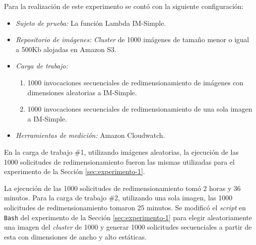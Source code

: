 Para la realización de este experimento se contó con la siguiente configuración:
\begin{itemize}
    \item \emph{Sujeto de prueba:} La función Lambda IM-Simple.
    \item \emph{Repositorio de imágenes:} \emph{Cluster} de 1000 imágenes de tamaño menor o igual a 500Kb alojadas en Amazon S3.
    \item \emph{Carga de trabajo:} 
    \begin{enumerate}
        \item 1000 invocaciones secuenciales de redimensionamiento de imágenes con dimensiones aleatorias a IM-Simple.
        \item 1000 invocaciones secuenciales de redimensionamiento de una sola imagen a IM-Simple.
    \end{enumerate}
    \item \emph{Herramientas de medición:} Amazon Cloudwatch.
\end{itemize}

En la carga de trabajo \#1, utilizando imágenes aleatorias, la ejecución de las 1000 solicitudes de redimensionamiento fueron las mismas utilizadas para el experimento de la Sección \ref{sec:experimento-1}. 

La ejecución de las 1000 solicitudes de redimensionamiento tomó 2 horas y 36 minutos. Para la carga de trabajo \#2, utilizando una sola imagen, las 1000 solicitudes de redimensionamiento tomaron 25 minutos. Se modificó el \emph{script} en \texttt{Bash} del experimento de la Sección \ref{sec:experimento-1} para elegir aleatoriamente una imagen del \emph{cluster} de 1000 y generar 1000 solicitudes secuenciales a partir de esta con dimensiones de ancho y alto estáticas.

